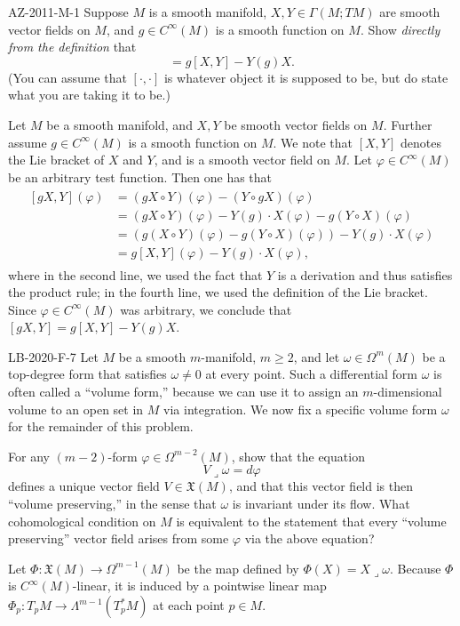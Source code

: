 \documentclass{article}
\begin{document}
	\begin{prb}{AZ-2011-M-1}
		Suppose $M$ is a smooth manifold, $X, Y \in \Gamma(M; TM)$ are smooth vector fields on $M$, and $g \in C^{\infty}(M)$ is a smooth function on $M$. Show \textit{directly from the definition} that 
		\begin{equation*}
			[gX, Y] = g[X, Y] - Y(g)X. 
		\end{equation*}
		(You can assume that $[\cdot, \cdot]$ is whatever object it is supposed to be, but do state what you are taking it to be.)
	\end{prb}
	Let $M$ be a smooth manifold, and $X, Y$ be smooth vector fields on $M$. Further assume $g \in C^{\infty}(M)$ is a smooth function on $M$. We note that $[X, Y]$ denotes the Lie bracket of $X$ and $Y$, and is a smooth vector field on $M$. Let $\varphi \in C^{\infty}(M)$ be an arbitrary test function. Then one has that
	\begin{align*}
		\begin{split}
			[gX,Y](\varphi) &= (gX \circ Y)(\varphi) - (Y \circ gX)(\varphi) \\
			&= (gX \circ Y)(\varphi) - Y(g) \cdot X(\varphi) - g (Y \circ X)(\varphi) \\
			&= \left(g(X \circ Y)(\varphi) - g(Y \circ X)(\varphi)\right) - Y(g) \cdot X(\varphi) \\
			&= g[X,Y](\varphi) - Y(g) \cdot X(\varphi), 
		\end{split}
	\end{align*}
	where in the second line, we used the fact that $Y$ is a derivation and thus satisfies the product rule; in the fourth line, we used the definition of the Lie bracket. Since $\varphi \in C^{\infty}(M)$ was arbitrary, we conclude that $[gX,Y] = g[X,Y] - Y(g)X$. 
	
	\begin{prb}{LB-2020-F-7}
		Let $M$ be a smooth $m$-manifold, $m \geq 2$, and let $\omega \in \Omega^{m}(M)$ be a top-degree form that satisfies $\omega \neq 0$ at every point. Such a differential form $\omega$ is often called a ``volume form,'' because we can use it to assign an $m$-dimensional volume to an open set in $M$ via integration. We now fix a specific volume form $\omega$ for the remainder of this problem. 
		
		For any $(m-2)$-form $\varphi \in \Omega^{m-2}(M)$, show that the equation 
		\begin{equation*}
			V \lrcorner \omega = d\varphi 
		\end{equation*}
		defines a unique vector field $V \in \mathfrak{X}(M)$, and that this vector field is then ``volume preserving,'' in the sense that $\omega$ is invariant under its flow. What cohomological condition on $M$ is equivalent to the statement that every ``volume preserving'' vector field arises from some $\varphi$ via the above equation? 
	\end{prb}
	Let $\Phi: \mathfrak{X}(M) \to \Omega^{m-1}(M)$ be the map defined by $\Phi(X) = X \lrcorner \omega$. Because $\Phi$ is $C^\infty(M)$-linear, it is induced by a pointwise linear map $\Phi_p: T_p M \to \Lambda^{m-1}(T_p^* M)$ at each point $p \in M$.
	
\end{document}

